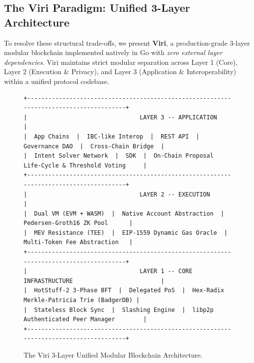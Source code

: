 \documentclass[10pt,journal,compsoc,twocolumn]{IEEEtran}
\begin{document}
\subsection{The Viri Paradigm: Unified 3-Layer Architecture}
To resolve these structural trade-offs, we present \textbf{Viri}, a production-grade 3-layer modular blockchain implemented natively in Go with \emph{zero external layer dependencies}. Viri maintains strict modular separation across Layer 1 (Core), Layer 2 (Execution \& Privacy), and Layer 3 (Application \& Interoperability) within a unified protocol codebase.

\begin{figure}[t]
\centering
\begin{verbatim}
+---------------------------------------------------------------------------------------+
|                                LAYER 3 -- APPLICATION                                 |
|  App Chains  |  IBC-like Interop  |  REST API  |  Governance DAO  |  Cross-Chain Bridge  |
|  Intent Solver Network  |  SDK  |  On-Chain Proposal Life-Cycle & Threshold Voting     |
+---------------------------------------------------------------------------------------+
|                                LAYER 2 -- EXECUTION                                   |
|  Dual VM (EVM + WASM)  |  Native Account Abstraction  |  Pedersen-Groth16 ZK Pool      |
|  MEV Resistance (TEE)  |  EIP-1559 Dynamic Gas Oracle  |  Multi-Token Fee Abstraction   |
+---------------------------------------------------------------------------------------+
|                                LAYER 1 -- CORE INFRASTRUCTURE                         |
|  HotStuff-2 3-Phase BFT  |  Delegated PoS  |  Hex-Radix Merkle-Patricia Trie (BadgerDB) |
|  Stateless Block Sync  |  Slashing Engine  |  libp2p Authenticated Peer Manager        |
+---------------------------------------------------------------------------------------+
\end{verbatim}
\caption{The Viri 3-Layer Unified Modular Blockchain Architecture.}
\label{fig:arch}
\end{figure}
\end{document}
